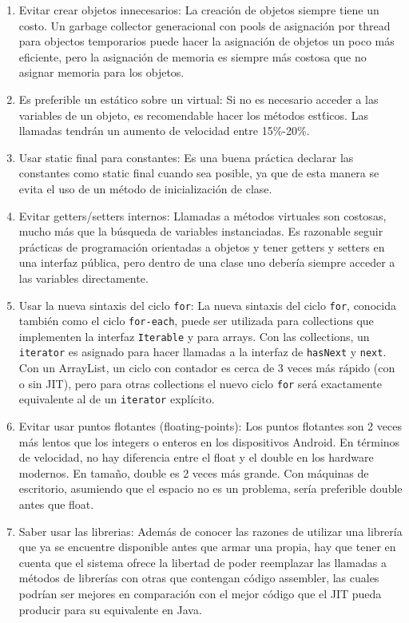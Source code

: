\begin{enumerate}

\item Evitar crear objetos innecesarios: La creaci\'on de objetos siempre tiene un costo. Un garbage collector generacional con pools de asignaci\'on por thread para objectos temporarios puede hacer la asignaci\'on de objetos un poco m\'as eficiente, pero la asignaci\'on de memoria es siempre m\'as costosa que no asignar memoria para los objetos.

\item Es preferible un est\'atico sobre un virtual: Si no es necesario acceder a las variables de un objeto, es recomendable hacer los m\'etodos est\'ticos. Las llamadas tendr\'an un aumento de velocidad entre 15\%-20\%.

\item Usar static final para constantes: Es una buena pr\'actica declarar las constantes como static final cuando sea posible, ya que de esta manera se evita el uso de un m\'etodo de inicializaci\'on de clase. 

\item Evitar getters/setters internos: Llamadas a m\'etodos virtuales son costosas, mucho m\'as que la b\'usqueda de variables instanciadas. Es razonable seguir pr\'acticas de programaci\'on orientadas a objetos y tener getters y setters en una interfaz p\'ublica, pero dentro de una clase uno deber\'ia siempre acceder a las variables directamente.

\item Usar la nueva sintaxis del ciclo \texttt{for}: La nueva sintaxis del ciclo \texttt{for}, conocida tambi\'en como el ciclo \texttt{for-each}, puede ser utilizada para collections que implementen la interfaz \texttt{Iterable} y para arrays. Con las collections, un \texttt{iterator} es asignado para hacer llamadas a la interfaz de \texttt{hasNext} y \texttt{next}. Con un ArrayList, un ciclo con contador es cerca de 3 veces m\'as r\'apido (con o sin \ac{JIT}), pero para otras collections el nuevo ciclo \texttt{for} ser\'a exactamente equivalente al de un \texttt{iterator} expl\'icito.

\item Evitar usar puntos flotantes (floating-points): Los puntos flotantes son 2 veces m\'as lentos que los integers o enteros en los dispositivos Android. En t\'erminos de velocidad, no hay diferencia entre el float y el double en los hardware modernos. En tama\~no, double es 2 veces m\'as grande. Con m\'aquinas de escritorio, asumiendo que el espacio no es un problema, ser\'ia preferible double antes que float. 

\item Saber usar las librerias: Adem\'as de conocer las razones de utilizar una librer\'ia que ya se encuentre disponible antes que armar una propia, hay que tener en cuenta que el sistema ofrece la libertad de poder reemplazar las llamadas a m\'etodos de librer\'ias con otras que contengan c\'odigo assembler, las cuales podr\'ian ser mejores en comparaci\'on con el mejor c\'odigo que el \ac{JIT} pueda producir para su equivalente en Java.

\end{enumerate}

